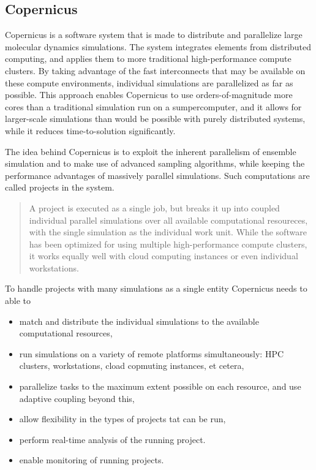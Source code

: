 \subsection{Copernicus}
Copernicus is a software system that is made to distribute and
parallelize large molecular dynamics simulations. The system
integrates elements from distributed computing, and applies them to
more traditional high-performance compute clusters. By taking
advantage of the fast interconnects that may be available on these
compute environments, individual simulations are parallelized as far
as possible. This approach enables Copernicus to use
orders-of-magnitude more cores than a traditional simulation run on a
sumpercomputer, and it allows for larger-scale simulations than would
be possible with purely distributed systems, while it reduces
time-to-solution significantly.

The idea behind Copernicus is to exploit the inherent parallelism of
ensemble simulation and to make use of advanced sampling algorithms,
while keeping the performance advantages of massively parallel
simulations. Such computations are called projects in the system.

\begin{quote}
  A project is executed as a single job, but breaks it up into coupled
  individual parallel simulations over all available computational
  resoureces, with the single simulation as the individual work
  unit. While the software has been optimized for using multiple
  high-performance compute clusters, it works equally well with cloud
  computing instances or even individual
  workstations.\citep{pronk:2011}
\end{quote}

To handle projects with many simulations as a single entity Copernicus
needs to able to
\renewcommand{\labelitemi}{-}
\begin{itemize}
\item match and distribute the individual simulations to the available
  computational resources,
\item run simulations on a variety of remote platforms simultaneously:
  HPC clusters, workstations, cload copmuting instances, et cetera,
\item parallelize tasks to the maximum extent possible on each
  resource, and use adaptive coupling beyond this,
\item allow flexibility in the types of projects tat can be run,
\item perform real-time analysis of the running project.
\item enable monitoring of running projects.\citep{pronk:2011}
\end{itemize}

